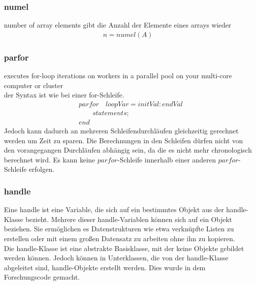 \documentclass[12pt,bibstyle=none,pagenumberinfooter]{ifmdocument}
\begin{document}
\subsubsection{numel}
\glqq number of array elements\grqq{}
gibt die Anzahl der Elemente eines \glqq arrays\grqq{} wieder
\begin{gather*}
	n=numel(A)
\end{gather*}
\subsubsection{parfor}
\glqq executes for-loop iterations on workers in a parallel pool on your multi-core computer or cluster\grqq{}\\
	der Syntax ist wie bei einer for-Schleife. 
\begin{align*}
	&parfor \quad loopVar = initVal:endVal\\
	&\qquad statements;\\
	&end
\end{align*}
Jedoch kann dadurch an mehreren Schleifendurchläufen gleichzeitig gerechnet werden um Zeit zu sparen. Die Berechnungen in den Schleifen dürfen nicht von den vorangegangen Durchläufen abhängig sein, da die es nicht mehr chronologisch berechnet wird. Es kann keine $parfor$-Schleife innerhalb einer anderen $parfor$-Schleife erfolgen.
\subsubsection{handle}
Eine \glqq handle\grqq{} ist eine Variable, die sich auf ein bestimmtes Objekt aus der handle-Klasse bezieht. Mehrere dieser handle-Variablen k\"onnen sich auf ein Objekt beziehen. Sie erm\"oglichen es Datenstrukturen wie etwa verkn\"upfte Listen zu erstellen oder mit einem großen Datensatz zu arbeiten ohne ihn zu kopieren.\\
Die handle-Klasse ist eine abstrakte Basisklasse, mit der keine Objekte gebildet werden k\"onnen. Jedoch k\"onnen in Unterklassen, die von der handle-Klasse abgeleitet sind, handle-Objekte erstellt werden. Dies wurde in dem Forschungscode gemacht.
\end{document}
